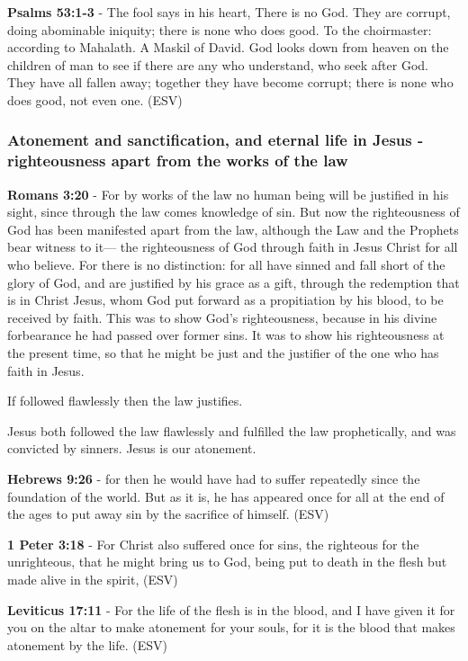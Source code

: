 \documentclass[11pt]{article}
\begin{document}
\textbf{Psalms 53:1-3} -  The fool says in his heart, There is no God.  They are corrupt, doing abominable iniquity; there is none who does good.  To the choirmaster: according to Mahalath.  A Maskil of David.  God looks down from heaven on the children of man to see if there are any who understand, who seek after God.  They have all fallen away; together they have become corrupt; there is none who does good, not even one.  (ESV)

\subsubsection{Atonement and sanctification, and eternal life in Jesus - righteousness apart from the works of the law}
\label{sec:org0d0fb91}
\textbf{Romans 3:20} - For by works of the law no human being will be justified in his sight, since through the law comes knowledge of sin.  But now the righteousness of God has been manifested apart from the law, although the Law and the Prophets bear witness to it— the righteousness of God through faith in Jesus Christ for all who believe. For there is no distinction: for all have sinned and fall short of the glory of God, and are justified by his grace as a gift, through the redemption that is in Christ Jesus, whom God put forward as a propitiation by his blood, to be received by faith. This was to show God's righteousness, because in his divine forbearance he had passed over former sins.  It was to show his righteousness at the present time, so that he might be just and the justifier of the one who has faith in Jesus.

If followed flawlessly then the law justifies.

Jesus both followed the law flawlessly and fulfilled the law prophetically, and was convicted by sinners. Jesus is our atonement.

\textbf{Hebrews 9:26} - for then he would have had to suffer repeatedly since the foundation of the world.  But as it is, he has appeared once for all at the end of the ages to put away sin by the sacrifice of himself.  (ESV)

\textbf{1 Peter 3:18} - For Christ also suffered once for sins, the righteous for the unrighteous, that he might bring us to God, being put to death in the flesh but made alive in the spirit,  (ESV)

\textbf{Leviticus 17:11} - For the life of the flesh is in the blood, and I have given it for you on the altar to make atonement for your souls, for it is the blood that makes atonement by the life.  (ESV)
\end{document}
